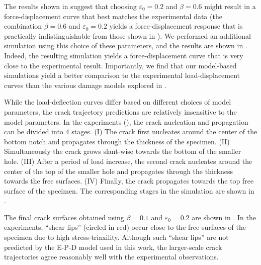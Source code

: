 The results shown in  suggest that choosing $\varepsilon_0=0.2$ and $\beta=0.6$ might result in a force-displacement curve that best matches the experimental data (the combination $\beta=0.6$ and $\varepsilon_0=0.2$ yields a force-displacement response that is practically indistinguishable from those shown in ).
We performed an additional simulation using this choice of these parameters, and the results are shown in . Indeed, the resulting simulation yields a force-displacement curve that is very close to the experimental result.   Importantly, we find that our model-based simulations yield a better comparison to the experimental load-displacement curves than the various damage models explored in \cite{kubik2019ductile}.



While the load-deflection curves differ based on different choices of model parameters, the crack trajectory predictions are relatively insensitive to the model parameters. In the experiments (), the crack nucleation and propagation can be divided into 4 stages. (I) The crack first nucleates around the center of the bottom notch and propagates through the thickness of the specimen. (II) Simultaneously the crack grows slant-wise towards the bottom of the smaller hole. (III) After a period of load increase, the second crack nucleates around the center of the top of the smaller hole and propagates through the thickness towards the free surfaces. (IV) Finally, the crack propagates towards the top free surface of the specimen.
The corresponding stages in the simulation are shown in .



The final crack surfaces obtained using $\beta = 0.1$ and $\varepsilon_0 = 0.2$ are shown in . In the experiments, ``shear lips'' (circled in red) occur close to the free surfaces of the specimen due to high stress-triaxility. Although such ``shear lips'' are not predicted by the E-P-D model used in this work, the larger-scale crack trajectories agree reasonably well with the experimental observations.

